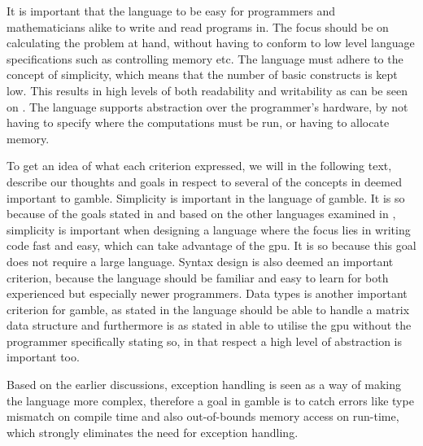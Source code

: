 It is important that the language to be easy for programmers and mathematicians alike to write and read programs in.
The focus should be on calculating the problem at hand, without having to conform to low level language specifications such as controlling memory etc.
The language must adhere to the concept of simplicity, which means that the number of basic constructs is kept low. 
This results in high levels of both readability and writability as can be seen on .
The language supports abstraction over the programmer's hardware, by not having to specify where the computations must be run, or having to allocate memory. 

To get an idea of what each criterion expressed, we will in the following text, describe our thoughts and goals in respect to several of the concepts in  deemed important to \gls{gamble}.
Simplicity is important in the language of \gls{gamble}.
It is so because of the goals stated in  and based on the other languages examined in , simplicity is important when designing a language where the focus lies in writing code fast and easy, which can take advantage of the \acrshort{gpu}.
It is so because this goal does not require a large language. 
Syntax design is also deemed an important criterion, because the language should be familiar and easy to learn for both experienced but especially newer programmers.
Data types is another important criterion for \gls{gamble}, as stated in  the language should be able to handle a matrix data structure and furthermore is as stated in  able to utilise the \acrshort{gpu} without the programmer specifically stating so, in that respect a high level of abstraction is important too. 

Based on the earlier discussions, exception handling is seen as a way of making the language more complex, therefore a goal in \gls{gamble} is to catch errors like type mismatch on compile time and also out-of-bounds memory access on run-time, which strongly eliminates the need for exception handling.


